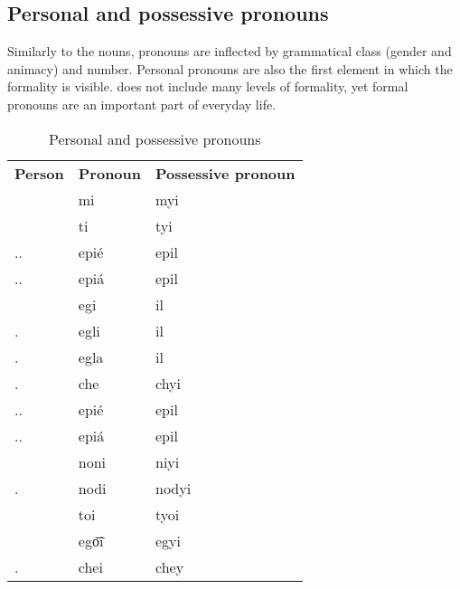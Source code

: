 \subsection{Personal and possessive pronouns}

Similarly to the nouns, pronouns are inflected by grammatical class (gender and
animacy) and number. Personal pronouns are also the first element in which the
formality is visible. \andro does not include many levels of formality, yet
formal pronouns are an important part of everyday life.

\begin{table}[]
    \caption{Personal and possessive pronouns}
    \label{tab:pronouns}
    \begin{tabular}{lll}
        \textbf{Person}    & \textbf{Pronoun} & \textbf{Possessive pronoun} \\
        \Fsg{}             & mi               & myi                         \\
        \Ssg{}             & ti               & tyi                         \\
        \Ssg{}.\M{}.\Frm{} & epié             & epil                        \\
        \Ssg{}.\F{}.\Frm{} & epiá             & epil                        \\
        \Tsg{}             & egi              & il                          \\
        \Tsg{}.\M{}        & egli             & il                          \\
        \Tsg{}.\F{}        & egla             & il                          \\
        \Tsg{}.\Inan{}     & che              & chyi                        \\
        \Tsg{}.\M{}.\Frm{} & epié             & epil                        \\
        \Tsg{}.\F{}.\Frm{} & epiá             & epil                        \\
        \Fpl{}             & noni             & niyi                        \\
        \Fpl{}.\Excl{}     & nodi             & nodyi                       \\
        \Spl{}             & toi              & tyoi                        \\
        \Tpl{}             & ego͞i             & egyi                        \\
        \Tpl{}.\Inan{}     & chei             & chey
    \end{tabular}
\end{table}

